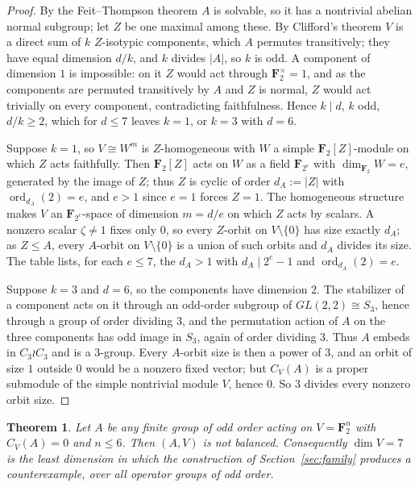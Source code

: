 \documentclass[11pt]{article}
\newtheorem{theorem}{Theorem}[section]
\theoremstyle{definition}
\theoremstyle{remark}
\newcommand{\F}{\mathbf F}
\begin{document}
\begin{proof}
By the Feit--Thompson theorem \cite{feit-thompson} $A$ is solvable, so
it has a nontrivial abelian normal subgroup; let $Z$ be one maximal
among these.  By Clifford's theorem \cite{clifford} $V$ is a direct
sum of $k$ $Z$-isotypic components,
which $A$ permutes transitively; they have equal dimension $d/k$, and
$k$ divides $|A|$, so $k$ is odd.  A component of dimension $1$ is
impossible: on it $Z$ would act through $\F_2^\times=1$, and as the
components are permuted transitively by $A$ and $Z$ is normal, $Z$
would act trivially on every component, contradicting faithfulness.
Hence $k\mid d$, $k$ odd, $d/k\ge2$, which for $d\le7$ leaves $k=1$, or
$k=3$ with $d=6$.

Suppose $k=1$, so $V\cong W^m$ is $Z$-homogeneous with $W$ a simple
$\F_2[Z]$-module on which $Z$ acts faithfully.  Then $\F_2[Z]$ acts on
$W$ as a field $\F_{2^e}$ with $\dim_{\F_2}W=e$, generated by the image
of $Z$; thus $Z$ is cyclic of order $d_A:=|Z|$ with
$\operatorname{ord}_{d_A}(2)=e$, and $e>1$ since $e=1$ forces $Z=1$.
The homogeneous structure makes $V$ an $\F_{2^e}$-space of dimension
$m=d/e$ on which $Z$ acts by scalars.  A nonzero scalar
$\zeta\neq1$ fixes only $0$, so every $Z$-orbit on $V\setminus\{0\}$
has size exactly $d_A$; as $Z\le A$, every $A$-orbit on
$V\setminus\{0\}$ is a union of such orbits and $d_A$ divides its size.
The table lists, for each $e\le7$, the $d_A>1$ with
$d_A\mid2^e-1$ and $\operatorname{ord}_{d_A}(2)=e$.

Suppose $k=3$ and $d=6$, so the components have dimension $2$.  The
stabilizer of a component acts on it through an odd-order subgroup of
$GL(2,2)\cong S_3$, hence through a group of order dividing $3$, and
the permutation action of $A$ on the three components has odd image in
$S_3$, again of order dividing $3$.  Thus $A$ embeds in
$C_3\wr C_3$ and is a $3$-group.  Every $A$-orbit size is then a power
of $3$, and an orbit of size $1$ outside $0$ would be a nonzero fixed
vector; but $C_V(A)$ is a proper submodule of the simple nontrivial
module $V$, hence $0$.  So $3$ divides every nonzero orbit size.
\end{proof}

\begin{theorem}\label{thm:dim-six}
Let $A$ be any finite group of odd order acting on $V=\F_2^n$ with
$C_V(A)=0$ and $n\le6$.  Then $(A,V)$ is not balanced.  Consequently
$\dim V=7$ is the least dimension in which the construction of
Section~\ref{sec:family} produces a counterexample, over all operator
groups of odd order.
\end{theorem}
\end{document}
